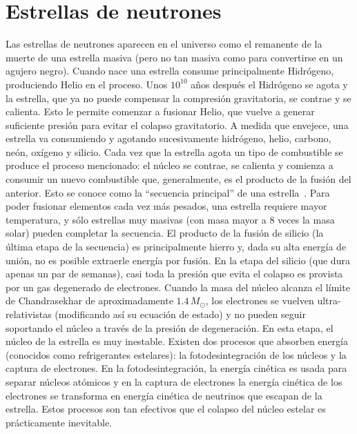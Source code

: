 \section{Estrellas de neutrones}\label{sc:intro}

Las estrellas de neutrones aparecen en el universo como el remanente de la muerte de una estrella masiva (pero no tan masiva como para convertirse en un agujero negro).
Cuando nace una estrella consume principalmente Hidrógeno, produciendo Helio en el proceso.
Unos $10^{10}$ años después el Hidrógeno se agota y la estrella, que ya no puede compensar la compresión gravitatoria, se contrae y se calienta.
Esto le permite comenzar a fusionar Helio, que vuelve a generar suficiente presión para evitar el colapso gravitatorio.
A medida que envejece, una estrella va consumiendo y agotando sucesivamente hidrógeno, helio, carbono, neón, oxígeno y silicio.
Cada vez que la estrella agota un tipo de combustible se produce el proceso mencionado: el núcleo se contrae, se calienta y comienza a consumir un nuevo combustible que, generalmente, es el producto de la fusión del anterior.
Esto se conoce como la ``secuencia principal'' de una estrella~\cite{woosley_physics_2005}.
Para poder fusionar elementos cada vez más pesados, una estrella requiere mayor temperatura, y sólo estrellas muy masivas (con masa mayor a 8 veces la masa solar) pueden completar la secuencia.
El producto de la fusión de silicio (la última etapa de la secuencia) es principalmente hierro y, dada su alta energía de unión, no es posible extraerle energía por fusión.
En la etapa del silicio (que dura apenas un par de semanas), casi toda la presión que evita el colapso es provista por un gas degenerado de electrones.
Cuando la masa del núcleo alcanza el límite de Chandrasekhar de aproximadamente $1.4\,M_\odot$, los electrones se vuelven ultra-relativistas (modificando así su ecuación de estado) y no pueden seguir soportando el núcleo a través de la presión de degeneración.
En esta etapa, el núcleo de la estrella es muy inestable.
Existen dos procesos que absorben energía (conocidos como refrigerantes estelares): la fotodesintegración de los núcleos y la captura de electrones.
En la fotodesintegración, la energía cinética es usada para separar núcleos atómicos y en la captura de electrones la energía cinética de los electrones se transforma en energía cinética de neutrinos que escapan de la estrella.
Estos procesos son tan efectivos que el colapso del núcleo estelar es prácticamente inevitable.

